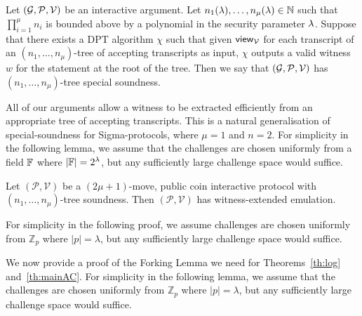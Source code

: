 \begin{definition}\label{def:treespecsound}
Let $(\mathcal{G},\mathcal{P},\mathcal{V})$ be an interactive argument. Let $n_1(\lambda),\ldots,n_\mu(\lambda) \in \mathbb{N}$ such that $\prod_{i=1}^\mu n_i$ is bounded above by a polynomial in the security parameter $\lambda$. Suppose that there exists a DPT algorithm $\chi$ such that given $\mathsf{view}_{\mathcal{V}}$ for each transcript of an $(n_1,\ldots,n_\mu)$-tree of accepting transcripts as input, $\chi$ outputs a valid witness $w$ for the statement at the root of the tree. Then we say that $(\mathcal{G},\mathcal{P},\mathcal{V})$ has $(n_1,\ldots,n_\mu)$-tree special soundness.
\end{definition}

All of our arguments allow a witness to be extracted efficiently from an appropriate tree of accepting transcripts. This is a natural generalisation of special-soundness for Sigma-protocols, where $\mu=1$ and $n=2$.  For simplicity in the following lemma, we assume that the challenges are chosen uniformly from a field $\mathbb{F}$ where $\left| \mathbb{F} \right| = 2^{\lambda}$, but any sufficiently large challenge space would suffice.

\begin{lemma}\label{lem:fork}
Let $(\mathcal{P},\mathcal{V})$ be a $(2\mu+1)$-move, public coin interactive protocol with $(n_1,\ldots,n_\mu)$-tree soundness. Then $(\mathcal{P},\mathcal{V})$ has witness-extended emulation. 
\end{lemma}
For simplicity in the following proof, we assume challenges are chosen uniformly from $\mathbb{Z}_p$ where $\left| p \right| = \lambda$, but any sufficiently large challenge space would suffice.

We now provide a proof of the Forking Lemma we need for Theorems~\ref{th:log} and~\ref{th:mainAC}. 
For simplicity in the following lemma, we assume that the challenges are chosen uniformly from $\mathbb{Z}_p$ where $\left| p \right| = \lambda$, but any sufficiently large challenge space would suffice.


